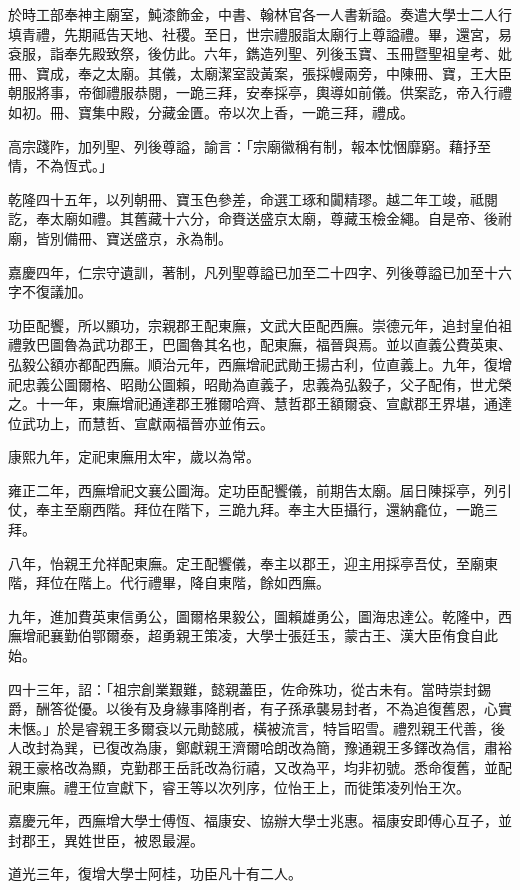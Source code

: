 \begin{pinyinscope}
於時工部奉神主廟室，魨漆飾金，中書、翰林官各一人書新謚。奏遣大學士二人行填青禮，先期祗告天地、社稷。至日，世宗禮服詣太廟行上尊謚禮。畢，還宮，易袞服，詣奉先殿致祭，後仿此。六年，鐫造列聖、列後玉寶、玉冊暨聖祖皇考、妣冊、寶成，奉之太廟。其儀，太廟潔室設黃案，張採幔兩旁，中陳冊、寶，王大臣朝服將事，帝御禮服恭閱，一跪三拜，安奉採亭，輿導如前儀。供案訖，帝入行禮如初。冊、寶集中殿，分藏金匱。帝以次上香，一跪三拜，禮成。

高宗踐阼，加列聖、列後尊謚，諭言：「宗廟徽稱有制，報本忱悃靡窮。藉抒至情，不為恆式。」

乾隆四十五年，以列朝冊、寶玉色參差，命選工琢和闐精璆。越二年工竣，祗閱訖，奉太廟如禮。其舊藏十六分，命賚送盛京太廟，尊藏玉檢金繩。自是帝、後祔廟，皆別備冊、寶送盛京，永為制。

嘉慶四年，仁宗守遺訓，著制，凡列聖尊謚已加至二十四字、列後尊謚已加至十六字不復議加。

功臣配饗，所以顯功，宗親郡王配東廡，文武大臣配西廡。崇德元年，追封皇伯祖禮敦巴圖魯為武功郡王，巴圖魯其名也，配東廡，福晉與焉。並以直義公費英東、弘毅公額亦都配西廡。順治元年，西廡增祀武勛王揚古利，位直義上。九年，復增祀忠義公圖爾格、昭勛公圖賴，昭勛為直義子，忠義為弘毅子，父子配侑，世尤榮之。十一年，東廡增祀通達郡王雅爾哈齊、慧哲郡王額爾袞、宣獻郡王界堪，通達位武功上，而慧哲、宣獻兩福晉亦並侑云。

康熙九年，定祀東廡用太牢，歲以為常。

雍正二年，西廡增祀文襄公圖海。定功臣配饗儀，前期告太廟。屆日陳採亭，列引仗，奉主至廟西階。拜位在階下，三跪九拜。奉主大臣攝行，還納龕位，一跪三拜。

八年，怡親王允祥配東廡。定王配饗儀，奉主以郡王，迎主用採亭吾仗，至廟東階，拜位在階上。代行禮畢，降自東階，餘如西廡。

九年，進加費英東信勇公，圖爾格果毅公，圖賴雄勇公，圖海忠達公。乾隆中，西廡增祀襄勤伯鄂爾泰，超勇親王策凌，大學士張廷玉，蒙古王、漢大臣侑食自此始。

四十三年，詔：「祖宗創業艱難，懿親藎臣，佐命殊功，從古未有。當時崇封錫爵，酬答從優。以後有及身緣事降削者，有子孫承襲易封者，不為追復舊恩，心實未愜。」於是睿親王多爾袞以元勛懿戚，橫被流言，特旨昭雪。禮烈親王代善，後人改封為巽，已復改為康，鄭獻親王濟爾哈朗改為簡，豫通親王多鐸改為信，肅裕親王豪格改為顯，克勤郡王岳託改為衍禧，又改為平，均非初號。悉命復舊，並配祀東廡。禮王位宣獻下，睿王等以次列序，位怡王上，而徙策凌列怡王次。

嘉慶元年，西廡增大學士傅恆、福康安、協辦大學士兆惠。福康安即傅心互子，並封郡王，異姓世臣，被恩最渥。

道光三年，復增大學士阿桂，功臣凡十有二人。


\end{pinyinscope}
